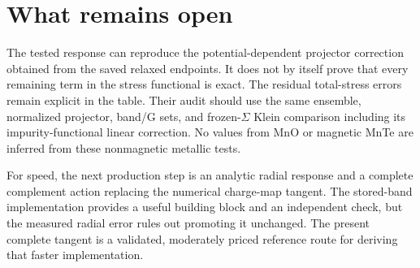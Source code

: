 \documentclass[11pt]{article}
\begin{document}
\section{What remains open}
The tested response can reproduce the potential-dependent projector
correction obtained from the saved relaxed endpoints. It does not by itself
prove that every remaining term in the stress functional is exact. The
residual total-stress errors remain explicit in the table. Their audit
should use the same ensemble, normalized projector, band/G sets, and
frozen-$\Sigma$ Klein comparison including its impurity-functional linear
correction. No values from MnO or magnetic MnTe are inferred from these
nonmagnetic metallic tests.

For speed, the next production step is an analytic radial response and a
complete complement action replacing the numerical charge-map tangent.
The stored-band implementation provides a useful building block and an
independent check, but the measured radial error rules out promoting it
unchanged. The present complete tangent is a validated, moderately priced
reference route for deriving that faster implementation.
\end{document}
